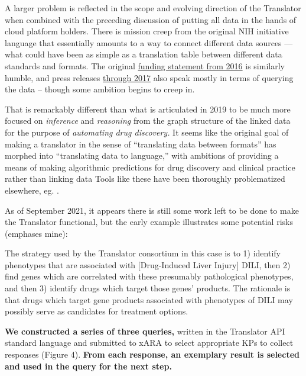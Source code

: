 \documentclass[11pt]{article}
\begin{document}
\begin{multicols}{2}
A larger problem is reflected in the scope and evolving direction of the
Translator when combined with the preceding discussion of putting all
data in the hands of cloud platform holders. There is mission creep from
the original NIH initiative language that essentially amounts to a way
to connect different data sources --- what could have been as simple as
a translation table between different data standards and formats. The
original
\href{https://web.archive.org/web/20210709100523/https://ncats.nih.gov/news/releases/2016/feasibility-assessment-translator}{funding
statement from 2016} is similarly humble, and press releases
\href{https://web.archive.org/web/20210709171335/https://ncats.nih.gov/pubs/features/translator}{through
2017} also speak mostly in terms of querying the data -- though some
ambition begins to creep in.

That is remarkably different than what is articulated in 2019 \cite{consortiumUniversalBiomedicalData2019}  to be much more focused on
\emph{inference} and \emph{reasoning} from the graph structure of the
linked data for the purpose of \emph{automating drug discovery.} It
seems like the original goal of making a translator in the sense of
``translating data between formats'' has morphed into ``translating data
to language,'' with ambitions of providing a means of making algorithmic
predictions for drug discovery and clinical practice rather than linking
data \cite{hailuNIHfundedProjectAims2019}  Tools like these have
been thoroughly problematized elsewhere, eg. \cite{groteEthicsAlgorithmicDecisionmaking2020
obermeyerDissectingRacialBias2019
panchArtificialIntelligenceAlgorithmic2019, panchInconvenientTruthAI2019} .

As of September 2021, it appears there is still some work left to be
done to make the Translator functional, but the early example
illustrates some potential risks (emphases mine):

\begin{leftbar}
The strategy used by the Translator consortium in this case is to 1)
identify phenotypes that are associated with {[}Drug-Induced Liver
Injury{]} DILI, then 2) find genes which are correlated with these
presumably pathological phenotypes, and then 3) identify drugs which
target those genes' products. The rationale is that drugs which target
gene products associated with phenotypes of DILI may possibly serve as
candidates for treatment options.

\textbf{We constructed a series of three queries,} written in the
Translator API standard language and submitted to xARA to select
appropriate KPs to collect responses (Figure 4). \textbf{From each
response, an exemplary result is selected and used in the query for the
next step.}


\end{leftbar}
\end{multicols}
\end{document}
